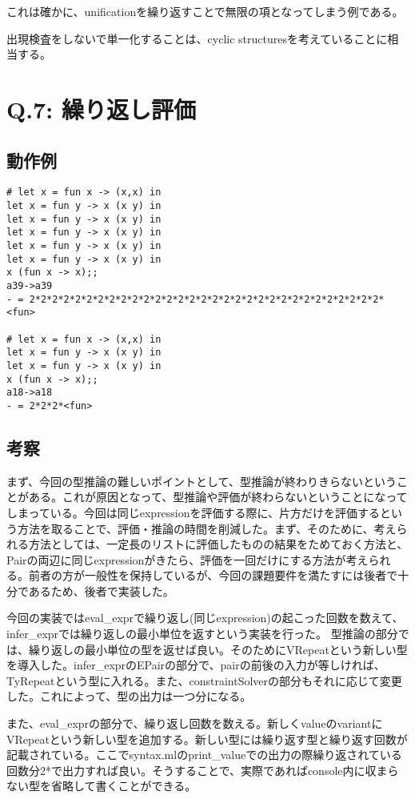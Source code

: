 \documentclass[uplatex,12pt]{jsarticle}
\begin{document}
これは確かに、unificationを繰り返すことで無限の項となってしまう例である。

出現検査をしないで単一化することは、cyclic structuresを考えていることに相当する。

\section{Q.7: 繰り返し評価}
\subsection{動作例}
\begin{lstlisting}[caption=動作例]
# let x = fun x -> (x,x) in
let x = fun y -> x (x y) in
let x = fun y -> x (x y) in
let x = fun y -> x (x y) in
let x = fun y -> x (x y) in
let x = fun y -> x (x y) in
x (fun x -> x);;
a39->a39
- = 2*2*2*2*2*2*2*2*2*2*2*2*2*2*2*2*2*2*2*2*2*2*2*2*2*2*2*2*2*2*2*<fun>

# let x = fun x -> (x,x) in
let x = fun y -> x (x y) in
let x = fun y -> x (x y) in
x (fun x -> x);;
a18->a18
- = 2*2*2*<fun>
\end{lstlisting}

\subsection{考察}
まず、今回の型推論の難しいポイントとして、型推論が終わりきらないということがある。これが原因となって、型推論や評価が終わらないということになってしまっている。今回は同じexpressionを評価する際に、片方だけを評価するという方法を取ることで、評価・推論の時間を削減した。まず、そのために、考えられる方法としては、一定長のリストに評価したものの結果をためておく方法と、Pairの両辺に同じexpressionがきたら、評価を一回だけにする方法が考えられる。前者の方が一般性を保持しているが、今回の課題要件を満たすには後者で十分であるため、後者で実装した。

今回の実装ではeval\_exprで繰り返し(同じexpression)の起こった回数を数えて、infer\_exprでは繰り返しの最小単位を返すという実装を行った。
型推論の部分では、繰り返しの最小単位の型を返せば良い。そのためにVRepeatという新しい型を導入した。infer\_exprのEPairの部分で、pairの前後の入力が等しければ、TyRepeatという型に入れる。また、constraintSolverの部分もそれに応じて変更した。これによって、型の出力は一つ分になる。

また、eval\_exprの部分で、繰り返し回数を数える。新しくvalueのvariantにVRepeatという新しい型を追加する。新しい型には繰り返す型と繰り返す回数が記載されている。ここでsyntax.mlのprint\_valueでの出力の際繰り返されている回数分2*で出力すれば良い。そうすることで、実際であればconsole内に収まらない型を省略して書くことができる。
\end{document}
